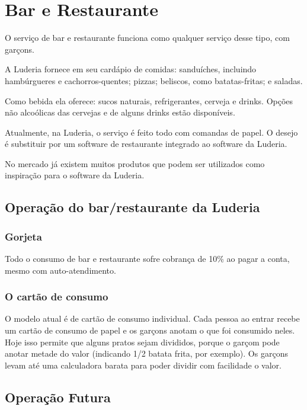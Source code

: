 \chapter{Bar e Restaurante}
\label{chap:barest}

O serviço de bar e restaurante funciona como qualquer serviço desse tipo, com  garçons.

A Luderia fornece em seu cardápio de comidas: sanduíches, incluindo hambúrgueres e cachorros-quentes;  pizzas; beliscos, como batatas-fritas; e saladas.

Como bebida ela oferece: sucos naturais, refrigerantes, cerveja e drinks. Opções não alcoólicas das cervejas e de alguns drinks estão disponíveis.

Atualmente, na Luderia, o serviço é feito todo com comandas de papel. O desejo é substituir por um software de restaurante integrado ao software da Luderia.

No mercado já existem muitos produtos que podem ser utilizados como inspiração para o software da Luderia.

\section{Operação do bar/restaurante da Luderia}

\subsection{Gorjeta}

Todo o consumo de bar e restaurante sofre cobrança de 10\% ao pagar a conta, mesmo com auto-atendimento.

\subsection{O cartão de consumo}

O modelo atual é de cartão de consumo individual. Cada pessoa ao entrar recebe um cartão de consumo de papel e os garçons anotam o que foi consumido neles. Hoje isso permite que alguns pratos sejam divididos, porque o garçom pode anotar metade do valor (indicando 1/2 batata frita, por exemplo). Os garçons levam até uma calculadora barata para poder dividir com facilidade o valor.


\section{Operação Futura} 

